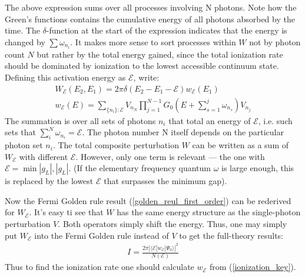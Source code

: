 The above expression sums over all processes involving N photons. Note how the Green's functions contains the cumulative energy of all photons absorbed by the time. The $ \delta $-function at the start of the expression indicates that the energy is changed by $ \sum\omega_{n_{i}} $. It makes more sense to sort processes within $ W $ not by photon count $ N $ but rather by the total energy gained, since the total ionization rate should be dominated by ionization to the lowest accessible continuum state. Defining this activation energy as $ \mathcal{E} $, write:
\begin{gather}
W_{\mathcal{E}}(E_{2},E_{1})=2\pi\delta(E_{2}-E_{1}-\mathcal{E})w_{\mathcal{E}}(E_{1})\\
\label{ionization_key}
w_{\mathcal{E}}(E)
=
\sum_{\{n_{i}\}:\mathcal{E}}V_{n_{N}}\prod_{j=1}^{N-1}G_{0}\left(E+\sum_{s=1}^{j}\omega_{n_{s}}\right)V_{n_{j}}
\end{gather}
The summation is over all sets of photons $ {n_{i}} $ that total an energy of $ \mathcal{E} $, i.e. such sets that $ \sum_{i}^{N}\omega_{n_{i}}=\mathcal{E} $. The photon number N itself depends on the particular photon set $ n_{i} $. The total composite perturbation $ W $ can be written as a sum of $ W_{\mathcal{E}} $ with different $ \mathcal{E} $. However, only one term is relevant --- the one with $ \mathcal{E}=\min{|g_{L}|,|g_{L}| }$. (If the elementary frequency quantum $ \omega $ is large enough, this is replaced by the lowest $ \mathcal{E} $ that surpasses the minimum gap). 

Now  the Fermi Golden rule result (\ref{golden_reul_first_order}) can be rederived 	for $ W_{\mathcal{E}} $. It's easy ti see that $ W $ has the same energy structure as the single-photon perturbation $ V $. Both operators simply shift the energy. Thus, one may simply put $ W_{\mathcal{E}} $ into the Fermi Golden rule instead of $ V $ to get the full-theory results:
\begin{gather}
	I=\frac{2\pi|\langle\mathcal{E}|w_{\mathcal{E}}|\Psi_{0}\rangle|^{2}}{N(\mathcal{E})}
\end{gather}
Thus to find the ionization rate one should calculate $ w_{\mathcal{E}} $ from (\ref{ionization_key}).